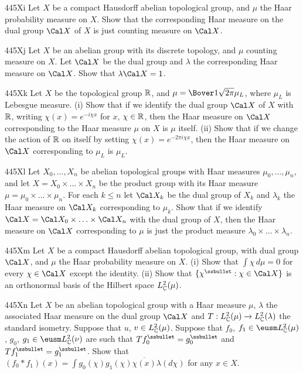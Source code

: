 {\sqheader 445Xi Let $X$ be a compact Hausdorff abelian topological
group, and $\mu$ the Haar probability measure on $X$.   Show that the
corresponding Haar measure on the dual group $\Cal X$ of $X$ is just
counting measure on $\Cal X$.

\sqheader 445Xj Let $X$ be an abelian group with its discrete topology,
and $\mu$ counting measure on $X$.   Let $\Cal X$ be the dual group and
$\lambda$ the corresponding Haar measure on $\Cal X$.   Show that
$\lambda\Cal X=1$.

\spheader 445Xk Let $X$ be the topological group $\Bbb R$, and
$\mu=\Bover1{\sqrt{2\pi}}\mu_L$, where $\mu_L$ is Lebesgue measure.
(i) Show that if we identify the dual group $\Cal X$ of $X$ with
$\Bbb R$, writing $\chi(x)=e^{-i\chi x}$ for $x$, $\chi\in\Bbb R$, then the
Haar measure on $\Cal X$ corresponding to the Haar measure $\mu$ on $X$
is $\mu$ itself.   (ii) Show that if we change the action of $\Bbb R$ on
itself by setting $\chi(x)=e^{-2\pi i\chi x}$, then the Haar measure on
$\Cal X$ corresponding to $\mu_L$ is $\mu_L$.

\spheader 445Xl Let $X_0,\ldots,X_n$ be abelian topological groups with
Haar measures $\mu_0,\ldots,\mu_n$, and let $X=X_0\times\ldots\times
X_n$ be the product group with its Haar measure
$\mu=\mu_0\times\ldots\times\mu_n$.   For each $k\le n$ let $\Cal X_k$
be the dual group of $X_k$ and $\lambda_k$ the Haar measure on $\Cal
X_k$ corresponding to $\mu_k$.   Show that if we identify
$\Cal X=\Cal X_0\times\ldots\times\Cal X_n$ with the dual group of $X$,
then the Haar measure on $\Cal X$ corresponding to $\mu$ is just the
product measure $\lambda_0\times\ldots\times\lambda_n$.

\sqheader 445Xm Let $X$ be a compact Hausdorff abelian topological
group, with dual group $\Cal X$, and $\mu$ the Haar probability measure
on $X$.   (i) Show that $\int\chi\,d\mu=0$ for every $\chi\in\Cal X$
except the identity.   (ii) Show that $\{\chi^{\ssbullet}:\chi\in\Cal
X\}$ is an orthonormal basis of the Hilbert space $L_{\Bbb C}^2(\mu)$.

\spheader 445Xn Let $X$ be an abelian topological group with a Haar
measure $\mu$, $\lambda$ the associated Haar measure on the dual group
$\Cal X$ and $T:L_{\Bbb C}^2(\mu)\to L_{\Bbb C}^2(\lambda)$ the standard
isometry.
Suppose that $u$, $v\in L_{\Bbb C}^2(\mu)$.   Suppose that $f_0$,
$f_1\in\eusm L_{\Bbb C}^2(\mu)$, $g_0$, $g_1\in\eusm L_{\Bbb C}^2(\nu)$
are such that
$Tf_0^{\ssbullet}=g_0^{\ssbullet}$ and
$Tf_1^{\ssbullet}=g_1^{\ssbullet}$.   Show that
$(f_0*f_1)(x)=\int g_0(\chi)g_1(\chi)\overline{\chi(x)}\lambda(d\chi)$
for any $x\in X$.

}
